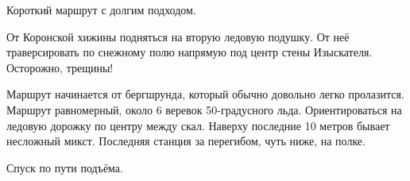 Короткий маршрут с долгим подходом.

От Коронской хижины подняться на вторую ледовую подушку. От неё
траверсировать по снежному полю напрямую под центр стены Изыскателя.
Осторожно, трещины!

Маршрут начинается от бергшрунда, который обычно довольно легко
пролазится. Маршрут равномерный, около 6 веревок 50-градусного льда.
Ориентироваться на ледовую дорожку по центру между скал. Наверху
последние 10 метров бывает несложный микст. Последняя станция за
перегибом, чуть ниже, на полке.

Спуск по пути подъёма.
